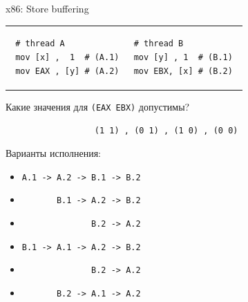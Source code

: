  
 \begin{frame}{x86: Store buffering}
 
 \begin{tabular}{p{} p{}}
 \begin{verbatim}
 # thread A
 mov [x] ,  1  # (A.1)
 mov EAX , [y] # (A.2)
 \end{verbatim}
 
 & 
 
 \begin{verbatim}
 # thread B          
 mov [y] , 1  # (B.1) 
 mov EBX, [x] # (B.2) 
 \end{verbatim}
 \end{tabular}
 
 \pause
 Какие значения для \texttt{(EAX EBX)} допустимы?
 
 \texttt{\ \ \ \ \ \ \ \ \ \ \ \ \ \ \ \ \ \ (1 1)\ , (0 1)\ , (1 0)\ , (0 0)}
 
 \pause
 Варианты исполнения:
 \begin{itemize}
     \item \texttt{A.1 -> A.2 -> B.1 -> B.2}
     \item \texttt{\ \ \ \ \ \ \       B.1 -> A.2 -> B.2}
     \item \texttt{\ \ \ \ \ \ \ \ \ \ \ \ \ \              B.2 -> A.2}
     \item \texttt{B.1 -> A.1 -> A.2 -> B.2}
     \item \texttt{\ \ \ \ \ \ \ \ \ \ \ \ \ \              B.2 -> A.2}
     \item \texttt{\ \ \ \ \ \ \       B.2 -> A.1 -> A.2}
 \end{itemize}
 \end{frame}
 

